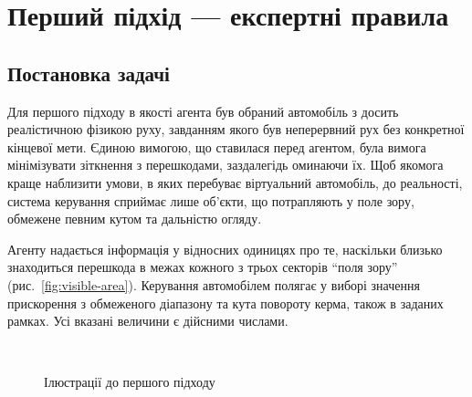 \documentclass[a4paper,10pt,fleqn]{article}
\begin{document}
\section{Перший підхід --- експертні правила}

\subsection{Постановка задачі}

Для першого підходу в якості агента був обраний автомобіль з досить реалістичною фізикою руху, завданням якого був неперервний рух без конкретної кінцевої мети. Єдиною вимогою, що ставилася перед агентом, була вимога мінімізувати зіткнення з перешкодами, заздалегідь оминаючи їх. Щоб якомога краще наблизити умови, в яких перебуває віртуальний автомобіль, до реальності, система керування сприймає лише об'єкти, що потрапляють у поле зору, обмежене певним кутом та дальністю огляду. 

Агенту надається інформація у відносних одиницях про те, наскільки близько знаходиться перешкода в межах кожного з трьох секторів ``поля зору'' (рис.~\ref{fig:visible-area}). Керування автомобілем полягає у виборі значення прискорення з обмеженого діапазону та кута повороту керма, також в заданих рамках. Усі вказані величини є дійсними числами.

\begin{figure}
  \centering
  \,
  \caption{Ілюстрації до першого підходу}
  \label{fig:car-related}
\end{figure}
\end{document}
